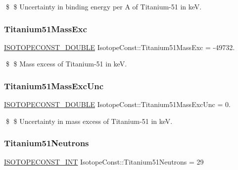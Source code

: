 \$ \$ Uncertainty in binding energy per A of Titanium-\/51 in keV. \mbox{\label{group___isotope_const-_titanium-_ti51_gaf3e557b5760527f359a5761bfb28a71a}} 
\subsubsection{\texorpdfstring{Titanium51\+Mass\+Exc}{Titanium51MassExc}}
{\footnotesize\ttfamily \mbox{\hyperlink{group___isotope_const-_macros_ga8f45a7272ce02c0b4c65c44636ed719a}{I\+S\+O\+T\+O\+P\+E\+C\+O\+N\+S\+T\+\_\+\+D\+O\+U\+B\+LE}} Isotope\+Const\+::\+Titanium51\+Mass\+Exc = -\/49732.}

\$ \$ Mass excess of Titanium-\/51 in keV. \mbox{\label{group___isotope_const-_titanium-_ti51_ga965a0357e5738a9061b31aba5f775b15}} 
\subsubsection{\texorpdfstring{Titanium51\+Mass\+Exc\+Unc}{Titanium51MassExcUnc}}
{\footnotesize\ttfamily \mbox{\hyperlink{group___isotope_const-_macros_ga8f45a7272ce02c0b4c65c44636ed719a}{I\+S\+O\+T\+O\+P\+E\+C\+O\+N\+S\+T\+\_\+\+D\+O\+U\+B\+LE}} Isotope\+Const\+::\+Titanium51\+Mass\+Exc\+Unc = 0.}

\$ \$ Uncertainty in mass excess of Titanium-\/51 in keV. \mbox{\label{group___isotope_const-_titanium-_ti51_ga39e63d0369aff673f4a3459fd0f64b84}} 
\subsubsection{\texorpdfstring{Titanium51\+Neutrons}{Titanium51Neutrons}}
{\footnotesize\ttfamily \mbox{\hyperlink{group___isotope_const-_macros_ga5f18360b3e99483a35c32d789e62621c}{I\+S\+O\+T\+O\+P\+E\+C\+O\+N\+S\+T\+\_\+\+I\+NT}} Isotope\+Const\+::\+Titanium51\+Neutrons = 29}

